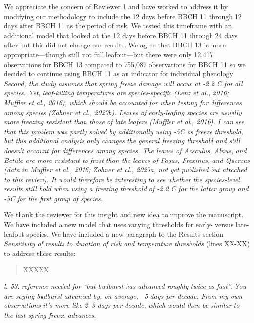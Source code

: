 \documentclass[11pt,a4paper]{article}
\begin{document}
We appreciate the concern of Reviewer 1 and have worked to address it by modifying our methodology to include the 12 days before BBCH 11 through 12 days after BBCH 11 as the period of risk. We tested this timeframe with an additional model that looked at the 12 days before BBCH 11 through 24 days after but this did not change our results. We agree that BBCH 13 is more appropriate---though still not full leafout---but there were only 12,417 observations for BBCH 13 compared to 755,087 observations for BBCH 11 so we decided to continue using BBCH 11 as an indicator for individual phenology. \\

\textit{Second, the study assumes that spring freeze damage will occur at -2.2 C for all species. Yet, leaf-killing temperatures are species-specific (Lenz et al., 2016; Muffler et al., 2016), which should be accounted for when testing for differences among species (Zohner et al., 2020b). Leaves of early-leafing species are usually more freezing resistant than those of late leafers (Muffler et al., 2016). I can see that this problem was partly solved by additionally using -5C as freeze threshold, but this additional analysis only changes the general freezing threshold and still doesn’t account for differences among species. The leaves of Aesculus, Alnus, and Betula are more resistant to frost than the leaves of Fagus, Fraxinus, and Quercus (data in Muffler et al., 2016; Zohner et al., 2020a, not yet published but attached to this review). It would therefore be interesting to see whether the species-level results still hold when using a freezing threshold of -2.2 C for the latter group and -5C for the first group of species.}

We thank the reviewer for this insight and new idea to improve the manuscript. We have included a new model that uses varying thresholds for early- versus late-leafout species. We have included a new paragraph to the Results section \textit*{Sensitivity of results to duration of risk and temperature thresholds} (lines XX-XX) to address these results:

\begin{quotation}
\noindent  XXXXX
\end{quotation}

\textit{l. 53: reference needed for “but budburst has advanced roughly twice as fast”. You are saying budburst advanced by, on average, ~5 days per decade. From my own observations it’s more like 2–3 days per decade, which would then be similar to the last spring freeze advances.}
\end{document}
